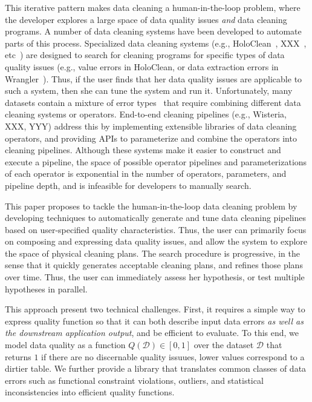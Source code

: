This iterative pattern makes data cleaning a human-in-the-loop problem, where the developer explores a large space of data quality issues {\it and} data cleaning programs.  A number of data cleaning systems have been developed to automate parts of this process.  Specialized data cleaning systems (e.g., HoloClean~\cite{}, XXX~\cite{}, etc~\cite{}) are designed to search for cleaning programs for specific types of data quality issues (e.g., value errors in HoloClean, or data extraction errors in Wrangler~\cite{}).  Thus, if the user finds that her data quality issues are applicable to such a system, then she can tune the system  and run it.  
Unfortunately, many datasets contain a mixture of error types~\cite{} that require combining different data cleaning systems or operators.  End-to-end cleaning pipelines (e.g., Wisteria, XXX, YYY) address this by implementing extensible libraries of data cleaning operators, and providing APIs to parameterize and combine the operators into cleaning pipelines.  Although these systems make it easier to construct and execute a pipeline, the space of possible operator pipelines and parameterizations of each operator is exponential in the number of operators, parameters, and pipeline depth, and is infeasible for developers to manually search.

This paper proposes to tackle the human-in-the-loop data cleaning problem by developing techniques to automatically generate and tune data cleaning pipelines based on user-specified quality characteristics.  Thus, the user can primarily focus on composing and expressing data quality issues, and allow the system to explore the space of physical cleaning plans.  The search procedure is progressive, in the sense that it quickly generates acceptable cleaning plans, and refines those plans over time.  Thus, the user can immediately assess her hypothesis, or test multiple hypotheses in parallel.

This approach present two technical challenges. First, it requires a simple way to express quality function so that it can both describe input data errors {\it as well as the downstream application output}, and be efficient to evaluate.   
To this end, we model data quality as a function $Q(\mathcal{D}) \in [0, 1]$ over the dataset $\mathcal{D}$ that returns $1$ if there are no discernable quality issuues, lower values correspond to a dirtier table. We further provide a library that translates common classes of data errors such as functional constraint violations, outliers, and statistical inconsistencies into efficient quality functions.


